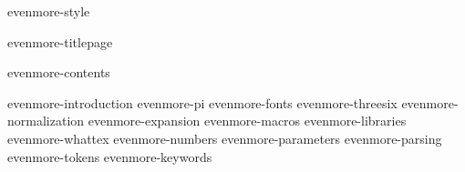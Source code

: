 \environment evenmore-style

\dontcomplain

\startdocument

    \component evenmore-titlepage

    \startfrontmatter
        \component evenmore-contents
    \stopfrontmatter

    \startbodymatter
        \component evenmore-introduction
        \component evenmore-pi
        \component evenmore-fonts
        \component evenmore-threesix
        \component evenmore-normalization
        \component evenmore-expansion
        \component evenmore-macros
        \component evenmore-libraries
        \component evenmore-whattex
        \component evenmore-numbers
        \component evenmore-parameters
        \component evenmore-parsing
        \component evenmore-tokens
        \component evenmore-keywords

         \stopchapter
         \stopchapter
         \stopchapter
         \stopchapter
         \stopchapter


    \stopbodymatter

\stopdocument
